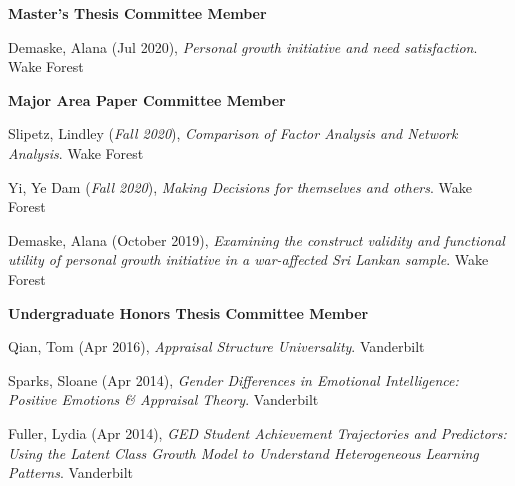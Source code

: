 {\large\textbf{Master's Thesis Committee Member}}
\begin{etaremune}%
\item Demaske, Alana (Jul 2020), \textit{Personal growth initiative and need satisfaction}. Wake Forest%
\end{etaremune}%
%
{\large\textbf{Major Area Paper Committee Member}}
\begin{etaremune}%
\item Slipetz, Lindley (\textit{Fall 2020}), \textit{Comparison of Factor Analysis and Network Analysis}. Wake Forest%
\item Yi, Ye Dam (\textit{Fall 2020}), \textit{Making Decisions for themselves and others}. Wake Forest%
\item Demaske, Alana (October 2019), \textit{Examining the construct validity and functional utility of personal growth initiative in a war-affected Sri Lankan sample}. Wake Forest%
\end{etaremune}%
%
{\large\textbf{Undergraduate Honors Thesis Committee Member}}
\begin{etaremune}
\item Qian, Tom (Apr 2016), \textit{Appraisal Structure Universality}. Vanderbilt%
%
\item Sparks, Sloane (Apr 2014), \textit{Gender Differences in Emotional Intelligence: Positive Emotions \& Appraisal Theory}. Vanderbilt%
\item Fuller, Lydia (Apr 2014), \textit{GED Student Achievement Trajectories and Predictors: Using the Latent Class Growth Model to Understand Heterogeneous Learning Patterns}. Vanderbilt%
\end{etaremune}
